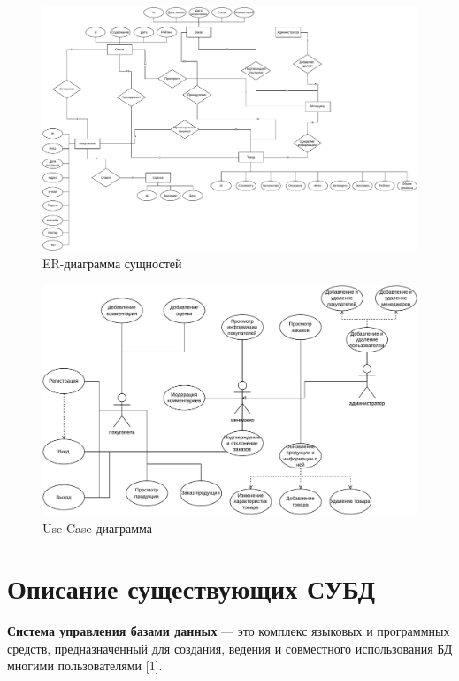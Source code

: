 \captionsetup{singlelinecheck = false, justification=centering}
\begin{figure}[h!]
	\begin{center}
		\includegraphics[scale=0.45, angle=90]{assets/er.pdf}
	\end{center}
	\caption{ER-диаграмма сущностей}
	\label{er_diagram}
\end{figure}

\captionsetup{singlelinecheck = false, justification=centering}
\begin{figure}[h!]
	\begin{center}
		\includegraphics[scale=0.6]{assets/use_case.pdf}
	\end{center}
	\caption{Use-Case диаграмма}
	\label{use_case}
\end{figure}

\section{Описание существующих СУБД}
\textbf{Система управления базами данных} --- это комплекс языковых и программных средств, предназначенный для создания, ведения и совместного использования БД многими пользователями [1]. 

